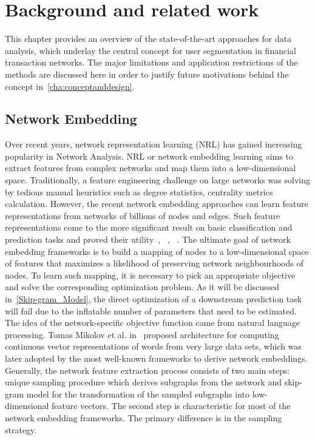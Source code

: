\chapter{Background and related work}
\label{cha:background}

This chapter provides an overview of the state-of-the-art approaches for data analysis, which underlay the central concept for user segmentation in financial transaction networks. The major limitations and application restrictions of the methods are discussed here in order to justify future motivations behind the concept in~\ref{cha:conceptanddesign}.

\section{Network Embedding}
Over recent years, network representation learning (NRL) has gained increasing popularity in Network Analysis. NRL or network embedding learning aims to extract features from complex networks and map them into a low-dimensional space. Traditionally, a feature engineering challenge on large networks was solving by tedious manual heuristics such as degree statistics, centrality metrics calculation. However, the recent network embedding approaches can learn feature representations from networks of billions of nodes and edges. Such feature representations come to the more significant result on basic classification and prediction tasks and proved their utility~\cite{node2vec}, ~\cite{perozzi2014deepwalk}, ~\cite{tang2015line}. The ultimate goal of network embedding frameworks is to build a mapping of nodes to a low-dimensional space of features that maximizes a likelihood of preserving network neighbourhoods of nodes.  To learn such mapping, it is necessary to pick an appropriate objective and solve the corresponding optimization problem.  As it will be discussed in~\ref{Skip-gram_Model}, the direct optimization of a downstream prediction task will fail due to the inflatable number of parameters that need to be estimated. The idea of the network-specific objective function came from natural language processing. Tomas Mikolov et al. in~\cite{SKIP-GRAM-MODEL} proposed architecture for computing continuous vector representations of words from very large data sets, which was later adopted by the most well-known frameworks to derive network embeddings.
Generally, the network feature extraction process consists of two main steps: unique sampling procedure which derives subgraphs from the network and skip-gram model for the transformation of the sampled subgraphs into low-dimensional feature vectors. The second step is characteristic for most of the network embedding frameworks. The primary difference is in the sampling strategy.

